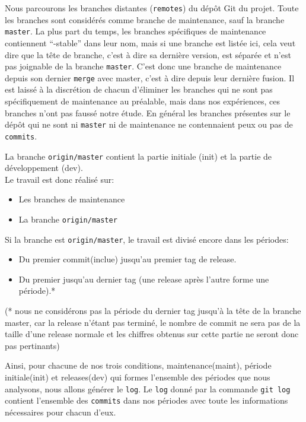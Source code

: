 Nous parcourons les branches distantes (\texttt{remotes}) du dépôt Git du projet. Toute les branches sont considérés comme branche de maintenance, sauf la branche \texttt{master}. La plus part du temps, les branches spécifiques de maintenance contiennent ``-stable'' dans leur nom, mais si une branche est listée ici, cela veut dire que la tête de branche, c'est à dire sa dernière version, est séparée et n'est pas joignable de la branche \texttt{master}. C'est donc une branche de maintenance depuis son dernier \texttt{merge} avec master, c'est à dire depuis leur dernière fusion. Il est laissé à la discrétion de chacun d'éliminer les branches qui ne sont pas spécifiquement de maintenance au préalable, mais dans nos expériences, ces branches n'ont pas faussé notre étude. En général les branches présentes sur le dépôt qui ne sont ni \texttt{master} ni de maintenance ne contennaient peux ou pas de \texttt{commits}.

La branche \texttt{origin/master} contient la partie initiale (init) et la partie de développement (dev).\\  
Le travail est donc réalisé sur: 
\begin{itemize}
\item Les branches de maintenance
\item La branche \texttt{origin/master}
\end{itemize}
\medskip
Si la branche est \texttt{origin/master}, le travail est divisé encore dans les périodes:
\begin{itemize}
\item Du premier commit(inclue) jusqu'au premier tag de release.
\item Du premier jusqu'au dernier tag (une release après l'autre forme une période).*
\end{itemize}
\medskip

(* nous ne considérons pas la période du dernier tag jusqu'à la tête de la branche master, car la release n'étant pas terminé, le nombre de commit ne sera pas de la taille d'une release normale et les chiffres obtenus sur cette partie ne seront donc pas pertinants)

Ainsi, pour chacune de nos trois conditions, maintenance(maint), période initiale(init) et releases(dev) qui formes l'ensemble des périodes que nous analysons, nous allons générer le \texttt{log}. Le \texttt{log} donné par la commande \texttt{git log} contient l'ensemble des \texttt{commits} dans nos périodes avec toute les informations nécessaires pour chacun d'eux.

